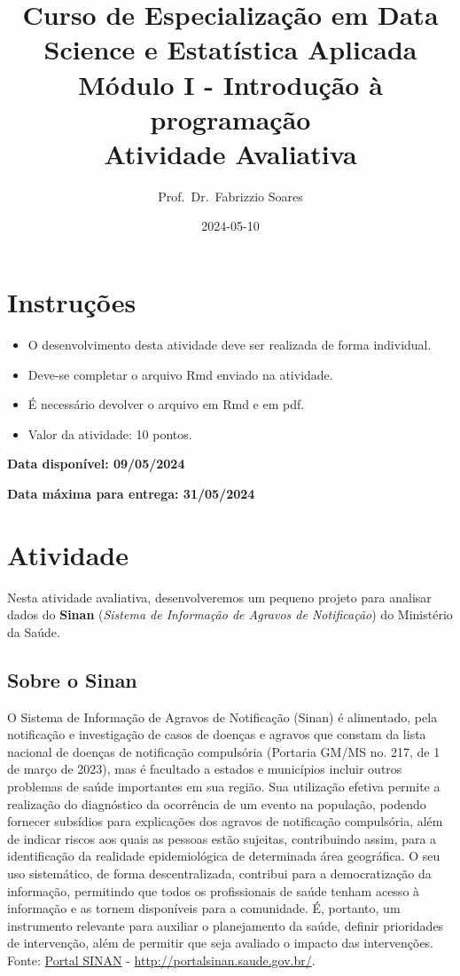 \documentclass[
]{article}
\title{Curso de Especialização em Data Science e Estatística Aplicada
Módulo I - Introdução à programação\\
Atividade Avaliativa}
\author{Prof.~Dr.~Fabrizzio Soares}
\date{2024-05-10}
\begin{document}
\maketitle

\section{Instruções}\label{instruuxe7uxf5es}

\begin{itemize}
\item
  O desenvolvimento desta atividade deve ser realizada de forma
  individual.
\item
  Deve-se completar o arquivo Rmd enviado na atividade.
\item
  É necessário devolver o arquivo em Rmd e em pdf.
\item
  Valor da atividade: 10 pontos.
\end{itemize}

\textbf{Data disponível: 09/05/2024}

\textbf{Data máxima para entrega: 31/05/2024}

\section{Atividade}\label{atividade}

Nesta atividade avaliativa, desenvolveremos um pequeno projeto para
analisar dados do \textbf{Sinan} (\emph{Sistema de Informação de Agravos
de Notificação}) do Ministério da Saúde.

\subsection{Sobre o Sinan}\label{sobre-o-sinan}

O Sistema de Informação de Agravos de Notificação (Sinan) é alimentado,
pela notificação e investigação de casos de doenças e agravos que
constam da lista nacional de doenças de notificação compulsória
(Portaria GM/MS no. 217, de 1 de março de 2023), mas é facultado a
estados e municípios incluir outros problemas de saúde importantes em
sua região. Sua utilização efetiva permite a realização do diagnóstico
da ocorrência de um evento na população, podendo fornecer subsídios para
explicações dos agravos de notificação compulsória, além de indicar
riscos aos quais as pessoas estão sujeitas, contribuindo assim, para a
identificação da realidade epidemiológica de determinada área
geográfica. O seu uso sistemático, de forma descentralizada, contribui
para a democratização da informação, permitindo que todos os
profissionais de saúde tenham acesso à informação e as tornem
disponíveis para a comunidade. É, portanto, um instrumento relevante
para auxiliar o planejamento da saúde, definir prioridades de
intervenção, além de permitir que seja avaliado o impacto das
intervenções. Fonte: \href{http://portalsinan.saude.gov.br/}{Portal
SINAN} - \url{http://portalsinan.saude.gov.br/}.
\end{document}
